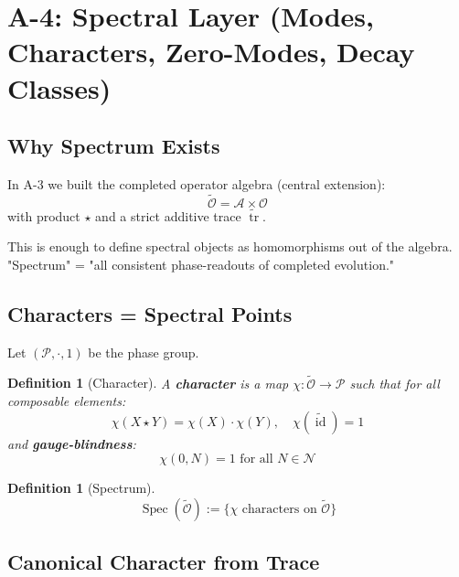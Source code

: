 \documentclass[12pt, oneside]{article}
\newtheorem{definition}[theorem]{Definition}
\DeclareMathOperator{\id}{id}
\DeclareMathOperator{\tr}{tr}
\DeclareMathOperator{\Spec}{Spec}
\newcommand{\N}{\mathcal{N}}
\newcommand{\A}{\mathcal{A}}
\newcommand{\Opr}{\mathcal{O}}
\newcommand{\wtilde}{\widetilde}
\begin{document}
\newpage

\section{A-4: Spectral Layer (Modes, Characters, Zero-Modes, Decay Classes)}

\subsection{Why Spectrum Exists}

In A-3 we built the completed operator algebra (central extension):
\begin{equation}
\wtilde{\Opr} = \A \times \Opr
\end{equation}
with product $\star$ and a strict additive trace $\wtilde{\tr}$.

This is enough to define spectral objects as homomorphisms out of the algebra. "Spectrum" = "all consistent phase-readouts of completed evolution."

\subsection{Characters = Spectral Points}

Let $(\mathcal{P}, \cdot, 1)$ be the phase group.

\begin{definition}[Character]
A \textbf{character} is a map $\chi: \wtilde{\Opr} \rightarrow \mathcal{P}$ such that for all composable elements:
\begin{equation}
\chi(X \star Y) = \chi(X) \cdot \chi(Y),\quad \chi(\wtilde{\id}) = 1
\end{equation}
and \textbf{gauge-blindness}:
\begin{equation}
\chi(0, N) = 1 \text{ for all } N \in \N
\end{equation}
\end{definition}

\begin{definition}[Spectrum]
\begin{equation}
\Spec(\wtilde{\Opr}) := \{ \chi \text{ characters on } \wtilde{\Opr} \}
\end{equation}
\end{definition}

\subsection{Canonical Character from Trace}
\end{document}
